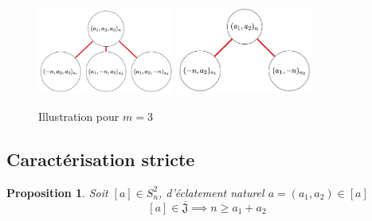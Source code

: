 \documentclass{article}
\newtheorem{proposition}{Proposition}
\newcommand{\J}{\mathfrak{J}}
\newcommand{\JS}{\overline{\J}}
\begin{document}
\begin{figure}[h]
    \caption{Illustration pour $m = 3$}
    \centering
    \includegraphics[width=0.4\textwidth]{abcn}
    \includegraphics[width=0.4\textwidth]{abn}
\end{figure}

\newpage

\subsection{Caractérisation stricte}

\begin{proposition}
    Soit $[a] \in S_n^2$, d'éclatement naturel $a = (a_1, a_2) \in [a]$
    \[ [a] \in \JS \implies n \geq a_1 + a_2 \]
\end{proposition} 
\end{document}
